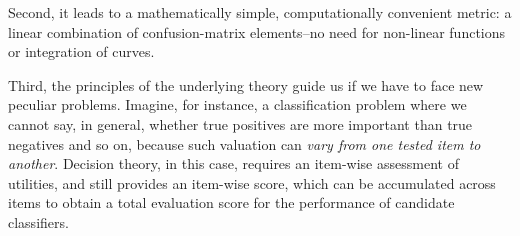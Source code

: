 \documentclass[\ifafour a4paper,12pt,\else a5paper,10pt,\fi%
onecolumn,oneside,article,%
british%
]{memoir}
\makeatletter
\newcommand*{\widefbox}[1]{\fbox{\hspace{1em}#1\hspace{1em}}}
\theoremstyle{remark}
\theoremstyle{innote}
\def\sum{\DOTSI\sumop\slimits@}
\newcommand*{\pencil}{{\fontencoding{U}\fontfamily{fontawesometwo}\selectfont\symbol{210}}}
\newcommand{\mynotep}[1]{{\footnotesize\color{notecolour}\pencil\ #1}}
\newcommand*{\de}{\partialup}%
\newcommand*{\p}{\mathrm{p}}%
\renewcommand*{\|}[1][]{\nonscript\:#1\vert\nonscript\:\mathopen{}}
\newcommand*{\tsum}{\mathop{\textstyle\sum}\nolimits}
\makeatother
\begin{document}
Second, it leads to a mathematically simple, computationally convenient metric: a linear combination of confusion-matrix elements--no need for non-linear functions or integration of curves.

Third, the principles of the underlying theory guide us if we have to face new peculiar problems. Imagine, for instance, a classification problem where we cannot say, in general, whether true positives are more important than true negatives and so on, because such valuation can \emph{vary from one tested item to another}. Decision theory, in this case, requires an item-wise assessment of utilities, and still provides an item-wise score, which can be accumulated across items to obtain a total evaluation score for the performance of candidate classifiers.












\end{document}
